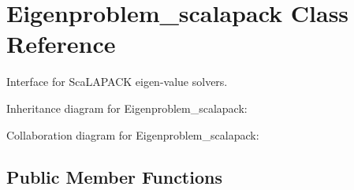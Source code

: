 \hypertarget{class_eigenproblem__scalapack}{}\section{Eigenproblem\+\_\+scalapack Class Reference}
\label{class_eigenproblem__scalapack}


Interface for Sca\+L\+A\+P\+A\+C\+K eigen-\/value solvers.  




Inheritance diagram for Eigenproblem\+\_\+scalapack\+:


Collaboration diagram for Eigenproblem\+\_\+scalapack\+:
\subsection*{Public Member Functions}
